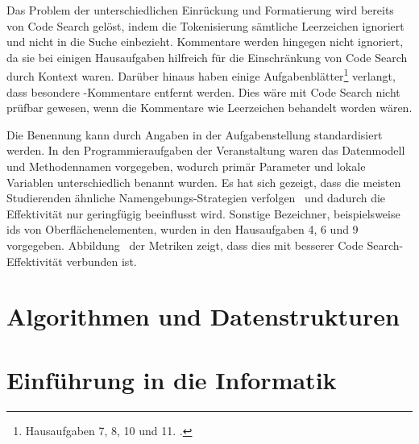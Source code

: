 Das Problem der unterschiedlichen Einrückung und Formatierung wird bereits von Code Search gelöst, indem die Tokenisierung sämtliche Leerzeichen ignoriert und nicht in die Suche einbezieht.
Kommentare werden hingegen nicht ignoriert, da sie bei einigen Hausaufgaben hilfreich für die Einschränkung von Code Search durch Kontext waren.
Darüber hinaus haben einige Aufgabenblätter\footnote{
    Hausaufgaben 7, 8, 10 und 11. .
} verlangt, dass besondere -Kommentare entfernt werden.
Dies wäre mit Code Search nicht prüfbar gewesen, wenn die Kommentare wie Leerzeichen behandelt worden wären.

Die Benennung kann durch Angaben in der Aufgabenstellung standardisiert werden.
In den Programmieraufgaben der Veranstaltung waren das Datenmodell und Methodennamen vorgegeben, wodurch primär Parameter und lokale Variablen unterschiedlich benannt wurden.
Es hat sich gezeigt, dass die meisten Studierenden ähnliche Namengebungs-Strategien verfolgen~ und dadurch die Effektivität nur geringfügig beeinflusst wird.
Sonstige Bezeichner, beispielsweise \acp{id} von Oberflächenelementen, wurden in den Hausaufgaben 4, 6 und 9 vorgegeben.
Abbildung~ der Metriken zeigt, dass dies mit besserer Code Search-Effektivität verbunden ist.


\section{Algorithmen und Datenstrukturen}\label{sec:algods-2021}


\section{Einführung in die Informatik}\label{sec:einfinf-2021-2022}

